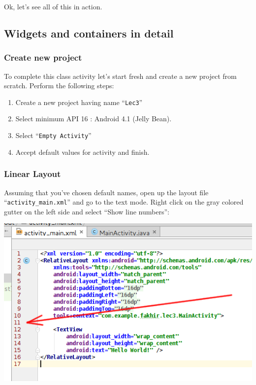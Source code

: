 Ok, let's see all of this in action.

\subsection{Widgets and containers in detail}
\subsubsection{Create new project}
\label{sec:createProj}

To complete this class activity let's start fresh and create a new project from scratch. Perform the following steps:
\begin{enumerate}
	\item Create a new project having name ``\texttt{Lec3}''
	\item Select minimum API 16 : Android 4.1 (Jelly Bean).
	\item Select ``\texttt{Empty Activity}''
	\item Accept default values for activity and finish.
\end{enumerate}

\subsubsection{Linear Layout}
Assuming that you've chosen default names, open up the layout file ``\texttt{activity\_main.xml}'' and go to the text mode. Right click on the gray colored gutter on the left side and select ``Show line numbers'':

\begin{center}
	\includegraphics[scale=0.4]{chapters/ch03/images/3_line_numbers}
\end{center}


